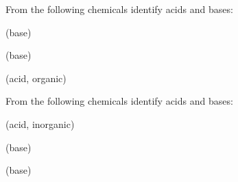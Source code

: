 \documentclass[main.tex]{subfiles}
\begin{document}
\begin{multicols*}{2}
\begin{question}[ID=\the\value{numA}]
From the following chemicals identify acids and bases:
\begin{inparaenum}[(a)]
\item {}			%
\item {}			%
\item {}			%
\end{inparaenum}
\end{question}
\begin{solution}
\begin{inparaenum}[(a)]
\item {}			(base)
\item {}			(base)
\item {}		(acid, organic)
 \end{inparaenum}\hspace{0.1cm}\end{solution}
\begin{question}[ID=\the\value{numA}]
From the following chemicals identify acids and bases:
\begin{inparaenum}[(a)]
\item {}			%
\item {}			%
\item {}			%
\end{inparaenum}
\end{question}
\begin{solution}
\begin{inparaenum}[(a)]
\item {}		(acid, inorganic)
\item {}			(base)
\item {}		(base)
 \end{inparaenum}\hspace{0.1cm}\end{solution}



\end{multicols*}
\end{document}
